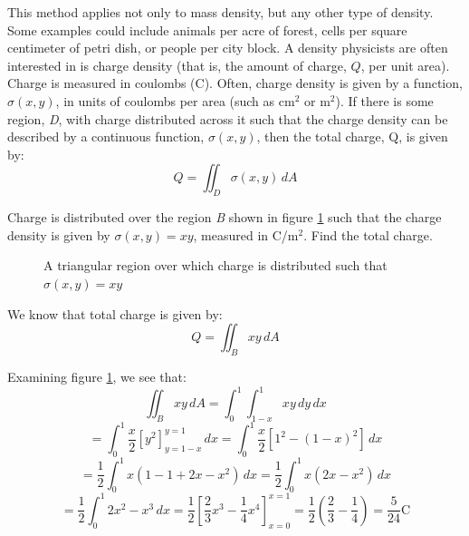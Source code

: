 This method applies not only to mass density, but any other type of density. 
Some examples could include animals per acre of forest, cells per square 
centimeter of petri dish, or people per city block. A density physicists are 
often interested in is charge density (that is, the amount of charge, $Q$, per 
unit area). Charge is measured in coulombs (C). Often, charge density is given 
by a function, $\sigma (x, y)$, in units of coulombs per area (such as 
$\text{cm}^2$ or $\text{m}^2$). If there is some region, \textit{D}, with 
charge distributed across it such that the charge density can be described 
by a continuous function, $\sigma (x, y)$, then the total charge, Q, is given 
by:
$$Q = \iint_{\textit{D}} \sigma (x, y)\,dA$$

\begin{Worked}
\begin{Problem}
Charge is distributed over the region \textit{B} shown in
figure \ref{fig:charge} such that the charge density is given by $\sigma (x, y)
= xy$, measured in C/$\text{m}^2$. Find the total charge. 

\begin{figure}[H]
\centering
    \caption{A triangular region over which charge is distributed such that 
    $\sigma (x, y) = xy$}
    \label{fig:charge}
\end{figure}
\end{Problem}
\begin{Solution}
We know that total charge is given by:
$$Q = \iint_{\textit{B}} xy\,dA$$ 

Examining figure \ref{fig:charge}, we see that:
$$\iint_{\textit{B}} xy\,dA = \int_0^1 \int_{1 - x}^1 xy\,dy\,dx$$
$$= \int_0^1 \frac{x}{2} \left[ y^2 \right]_{y = 1 - x}^{y = 1}\,dx = \int_0^1 
\frac{x}{2} \left[ 1^2 - \left( 1 - x \right)^2 \right]\,dx$$
$$= \frac{1}{2} \int_0^1 x \left(1 - 1 + 2x - x^2 \right)\,dx = \frac{1}{2} 
\int_0^1 x \left(2x - x^2 \right)\,dx$$
$$= \frac{1}{2} \int_0^1 2x^2 - x^3\,dx = \frac{1}{2} \left[ \frac{2}{3}x^3 - 
\frac{1}{4}x^4 \right]_{x = 0}^{x = 1} = \frac{1}{2} \left( \frac{2}{3} - 
\frac{1}{4} \right) = \frac{5}{24} \text{C}$$
\end{Solution}
\end{Worked}


